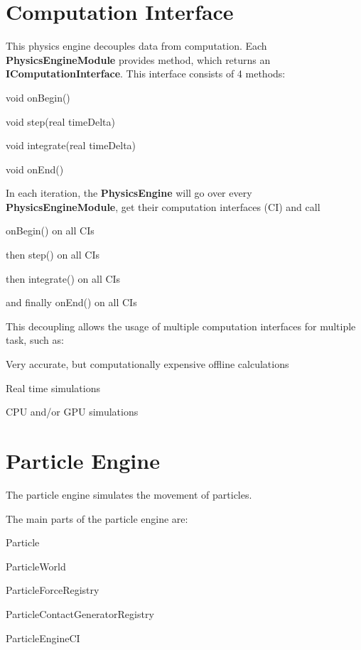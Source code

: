 \documentclass[12p, paper=a4, leqno, colorinlistoftodos]{article}
\newenvironment{packed_itemize}
{\begin{itemize}
		\setlength{\itemsep}{0pt}
		\setlength{\parskip}{0pt}
		\setlength{\parsep}{0pt}
	}{\end{itemize}}
\newenvironment{packed_enumerate}
{\begin{enumerate}
		\setlength{\itemsep}{0pt}
		\setlength{\parskip}{0pt}
		\setlength{\parsep}{0pt}
	}{\end{enumerate}}
\begin{document}
	\section{Computation Interface}
		This physics engine decouples data from computation. Each \textbf{PhysicsEngineModule} provides method, which returns an \textbf{IComputationInterface}. This interface consists of 4 methods:
		\begin{packed_itemize}
			\item void onBegin()
			\item void step(real timeDelta)
			\item void integrate(real timeDelta)
			\item void onEnd() 
		\end{packed_itemize}
		In each iteration, the \textbf{PhysicsEngine} will go over every \textbf{PhysicsEngineModule}, get their computation interfaces (CI) and call
		\begin{packed_enumerate}
			\item onBegin() on all CIs
			\item then step() on all CIs
			\item then integrate() on all CIs
			\item and finally onEnd() on all CIs
		\end{packed_enumerate}
		This decoupling allows the usage of multiple computation interfaces for multiple task, such as:
		\begin{packed_itemize}
			\item Very accurate, but computationally expensive offline calculations
			\item Real time simulations
			\item CPU and/or GPU simulations
		\end{packed_itemize}
	
	\pagebreak
	\section{Particle Engine}
		The particle engine simulates the movement of particles.
	
		The main parts of the particle engine are:
		\begin{packed_itemize}
			\item Particle
			\item ParticleWorld
			\item ParticleForceRegistry
			\item ParticleContactGeneratorRegistry
			\item ParticleEngineCI
		\end{packed_itemize}
		
\end{document}
